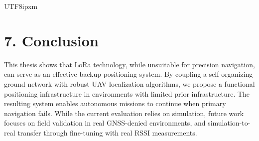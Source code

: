 \documentclass[a4paper,10pt,twocolumn]{article}
\begin{document}
\begin{CJK}{UTF8}{ipxm}
\section*{7. Conclusion}
This thesis shows that LoRa technology, while unsuitable for precision navigation, can serve as an effective backup positioning system.
By coupling a self-organizing ground network with robust UAV localization algorithms, we propose a functional positioning infrastructure in environments with limited prior infrastructure.
The resulting system enables autonomous missions to continue when primary navigation fails.
While the current evaluation relies on simulation, future work focuses on field validation in real GNSS-denied environments, and simulation-to-real transfer through fine-tuning with real RSSI measurements.




\end{CJK}
\end{document}
